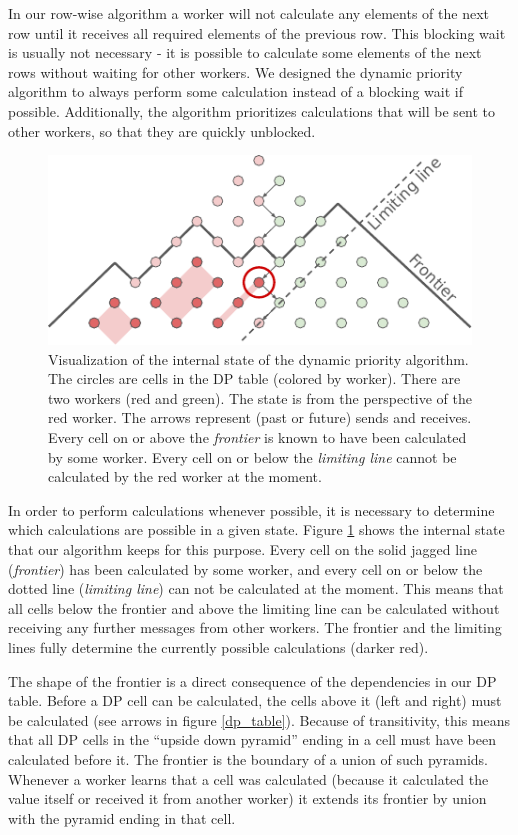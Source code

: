 In our row-wise algorithm a worker will not calculate any elements of the next row until it receives all required elements of the previous row. This blocking wait is usually not necessary - it is possible to calculate some elements of the next rows without waiting for other workers. We designed the dynamic priority algorithm to always perform some calculation instead of a blocking wait if possible. Additionally, the algorithm prioritizes calculations that will be sent to other workers, so that they are quickly unblocked.

\begin{figure}[hbt]\centering
  \includegraphics[width=0.85\linewidth]{images/dphpc-dynamic-priority-diagram.pdf}
  \caption{Visualization of the internal state of the dynamic priority algorithm. The circles are cells in the DP table (colored by worker). There are two workers (red and green). The state is from the perspective of the red worker. The arrows represent (past or future) sends and receives. Every cell on or above the \emph{frontier} is known to have been calculated by some worker. Every cell on or below the \emph{limiting line} cannot be calculated by the red worker at the moment.}
  \label{priority_state}
\end{figure}

In order to perform calculations whenever possible, it is necessary to determine which calculations are possible in a given state. Figure \ref{priority_state} shows the internal state that our algorithm keeps for this purpose. Every cell on the solid jagged line (\emph{frontier}) has been calculated by some worker, and every cell on or below the dotted line (\emph{limiting line}) can not be calculated at the moment. This means that all cells below the frontier and above the limiting line can be calculated without receiving any further messages from other workers. The frontier and the limiting lines fully determine the currently possible calculations (darker red).

The shape of the frontier is a direct consequence of the dependencies in our DP table. Before a DP cell can be calculated, the cells above it (left and right) must be calculated (see arrows in figure \ref{dp_table}). Because of transitivity, this means that all DP cells in the ``upside down pyramid'' ending in a cell must have been calculated before it. The frontier is the boundary of a union of such pyramids. Whenever a worker learns that a cell was calculated (because it calculated the value itself or received it from another worker) it extends its frontier by union with the pyramid ending in that cell.

